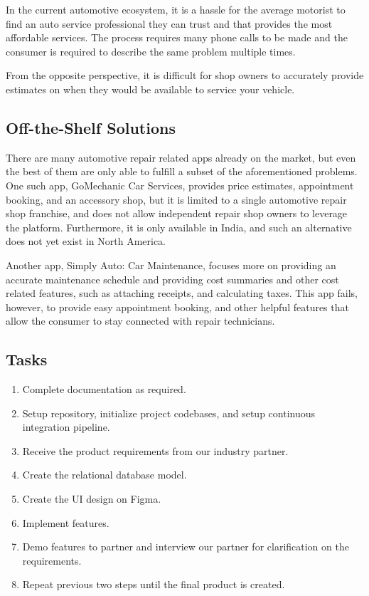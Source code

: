 \documentclass[12pt]{article}
\begin{document}
In the current automotive ecosystem, it is a hassle for the average motorist to find an auto service professional they can trust and that provides the most affordable services. The process requires many phone calls to be made and the consumer is required to describe the same problem multiple times.

From the opposite perspective, it is difficult for shop owners to accurately provide estimates on when they would be available to service your vehicle.

\subsection{Off-the-Shelf Solutions}

There are many automotive repair related apps already on the market, but even the best of them are only able to fulfill a subset of the aforementioned problems. One such app, GoMechanic Car Services, provides price estimates, appointment booking, and an accessory shop, but it is limited to a single automotive repair shop franchise, and does not allow independent repair shop owners to leverage the platform. Furthermore, it is only available in India, and such an alternative does not yet exist in North America.

Another app, Simply Auto: Car Maintenance, focuses more on providing an accurate maintenance schedule and providing cost summaries and other cost related features, such as attaching receipts, and calculating taxes. This app fails, however, to provide easy appointment booking, and other helpful features that allow the consumer to stay connected with repair technicians.

\subsection{Tasks}

\begin{enumerate}
    \item Complete documentation as required.
    \item Setup repository, initialize project codebases, and setup continuous integration pipeline.
    \item Receive the product requirements from our industry partner.
    \item Create the relational database model.
    \item Create the UI design on Figma.
    \item Implement features.
    \item Demo features to partner and interview our partner for clarification on the requirements.
    \item Repeat previous two steps until the final product is created.
\end{enumerate}
\end{document}
